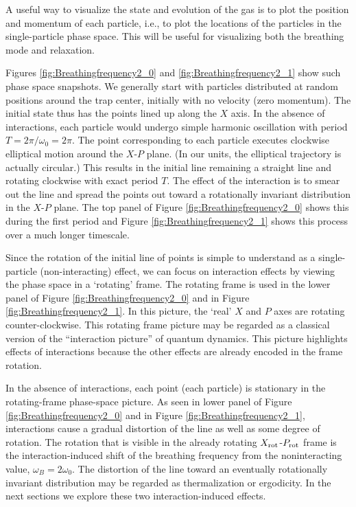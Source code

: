 \documentclass[aps,preprintnumbers,onecolumn,amsmath,amssymb,floatfix,pra]{revtex4-1}
\begin{document}
A useful way to visualize the state and evolution of the gas is to plot the position and momentum of
each particle, i.e., to plot the locations of the particles in the single-particle phase space.
This will be useful for visualizing both the breathing mode and relaxation. 

Figures \ref{fig:Breathingfrequency2_0} and \ref{fig:Breathingfrequency2_1} show such phase space
snapshots.  We generally start with particles distributed at random positions around the trap
center, initially with no velocity (zero momentum).  The initial state thus has the points lined up
along the $X$ axis.  In the absence of interactions, each particle would undergo simple harmonic
oscillation with period $T=2\pi/\omega_0 = 2\pi$.  The point corresponding to each particle executes
clockwise elliptical motion around the $X$-$P$ plane.  (In our units, the elliptical trajectory is
actually circular.)  This results in the initial line remaining a straight line and rotating
clockwise with exact period $T$.  The effect of the interaction is to smear out the line and spread
the points out toward a rotationally invariant distribution in the $X$-$P$ plane.  The top panel of
Figure \ref{fig:Breathingfrequency2_0} shows this during the first period and Figure
\ref{fig:Breathingfrequency2_1} shows this process over a much longer timescale.

Since the rotation of the initial line of points is simple to understand as a single-particle
(non-interacting) effect, we can focus on interaction effects by viewing the phase space in a
`rotating' frame.  The rotating frame is used in the lower panel of Figure
\ref{fig:Breathingfrequency2_0} and in Figure \ref{fig:Breathingfrequency2_1}.  In this picture, the
`real' $X$ and $P$ axes are rotating counter-clockwise.  This rotating frame picture may be regarded
as a classical version of the ``interaction picture'' of quantum dynamics.  This picture highlights
effects of interactions because the other effects are already encoded in the frame rotation.

In the absence of interactions, each point (each particle) is stationary in the rotating-frame
phase-space picture.  As seen in lower panel of Figure \ref{fig:Breathingfrequency2_0} and in Figure
\ref{fig:Breathingfrequency2_1}, interactions cause a gradual distortion of the line as well as some
degree of rotation.
%
The rotation that is visible in the already rotating $X_{\rm rot}$-$P_{\rm rot}$ frame is the
interaction-induced shift of the breathing frequency from the noninteracting value,
$\omega_B=2\omega_0$.  The distortion of the line toward an eventually rotationally invariant
distribution may be regarded as thermalization or ergodicity.  In the next sections we explore these
two interaction-induced effects.
\end{document}
